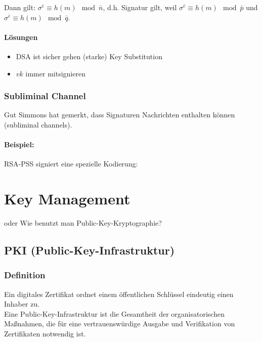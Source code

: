 \documentclass[a4paper,twoside,DIV15,BCOR12mm]{scrbook}
\begin{document}
Dann gilt: $\sigma^{\bar e} \equiv h(m) \mod{\bar n}$, d.h. Signatur gilt, weil $\sigma^{\bar e} \equiv h(m) \mod{\bar p}$ und $\sigma^{\bar e} \equiv h(m) \mod{\bar q}$.

\subsubsection{Lösungen}

\begin{itemize}
	\item DSA ist sicher gehen (starke) Key Substitution
	\item $vk$ immer mitsignieren
\end{itemize}

\subsection{Subliminal Channel}

Gut Simmons hat gemerkt, dass Signaturen Nachrichten enthalten können (subliminal channels). 

\subsubsection{Beispiel:}

RSA-PSS signiert eine spezielle Kodierung:\\



\chapter{Key Management}

oder Wie benutzt man Public-Key-Kryptographie?

\section{PKI (Public-Key-Infrastruktur)}

\subsection{\glqq Definition\grqq}

Ein digitales Zertifikat ordnet einem öffentlichen Schlüssel eindeutig einen Inhaber zu.\\ Eine Public-Key-Infrastruktur ist die Gesamtheit der organisatorischen Maßnahmen, die für eine vertrauenswürdige Ausgabe und Verifikation von Zertifikaten notwendig ist.\\
\end{document}
